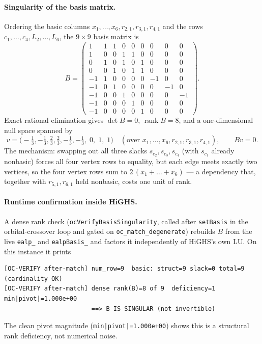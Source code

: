 \documentclass[11pt]{article}
\newcommand{\slack}[1]{s_{#1}}
\begin{document}
\paragraph{Singularity of the basis matrix.}
Ordering the basic columns $x_1,\dots,x_6,r_{2,1},r_{3,1},r_{4,1}$ and the rows
$c_1,\dots,c_4,L_2,\dots,L_6$, the $9\times9$ basis matrix is
\[
B=
\begin{pmatrix}
1&1&1&0&0&0& 0&0&0\\
1&0&0&1&1&0& 0&0&0\\
0&1&0&1&0&1& 0&0&0\\
0&0&1&0&1&1& 0&0&0\\
-1&1&0&0&0&0& -1&0&0\\
-1&0&1&0&0&0& 0&-1&0\\
-1&0&0&1&0&0& 0&0&-1\\
-1&0&0&0&1&0& 0&0&0\\
-1&0&0&0&0&1& 0&0&0
\end{pmatrix}.
\]
Exact rational elimination gives $\det B = 0$, $\operatorname{rank} B = 8$, and a
one-dimensional null space spanned by
\[
v=\bigl(-\tfrac13,-\tfrac13,\tfrac23,\tfrac23,-\tfrac13,-\tfrac13,\;0,\;1,\;1\bigr)
\quad(\text{over } x_1,\dots,x_6,r_{2,1},r_{3,1},r_{4,1}),\qquad Bv=0 .
\]
The mechanism: swapping out all three slacks $\slack{c_2},\slack{c_3},\slack{c_4}$
(with $\slack{c_1}$ already nonbasic) forces all four vertex rows to equality, but
each edge meets exactly two vertices, so the four vertex rows sum to
$2\,(x_1+\dots+x_6)$ --- a dependency that, together with $r_{5,1},r_{6,1}$ held
nonbasic, costs one unit of rank.

\paragraph{Runtime confirmation inside HiGHS.}
A dense rank check (\texttt{ocVerifyBasisSingularity}, called after
\texttt{setBasis} in the orbital-crossover loop and gated on
\texttt{oc\_match\_degenerate}) rebuilds $B$ from the live \texttt{ealp\_} and
\texttt{ealpBasis\_} and factors it independently of HiGHS's own LU. On this
instance it prints
\begin{verbatim}
[OC-VERIFY after-match] num_row=9  basic: struct=9 slack=0 total=9 (cardinality OK)
[OC-VERIFY after-match] dense rank(B)=8 of 9  deficiency=1  min|pivot|=1.000e+00
                        ==> B IS SINGULAR (not invertible)
\end{verbatim}
The clean pivot magnitude (\texttt{min|pivot|=1.000e+00}) shows this is a
structural rank deficiency, not numerical noise.
\end{document}
